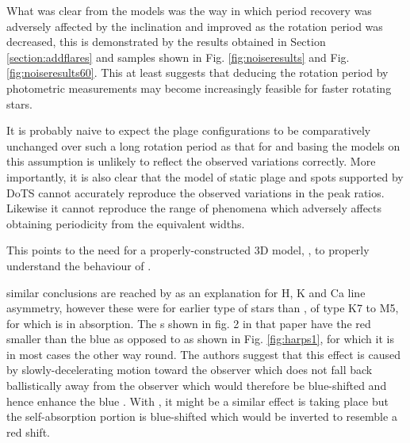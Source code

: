 What was clear from the models was the way in which period recovery was adversely affected by the inclination and
improved as the rotation period was decreased, this is demonstrated by the results obtained in Section
\ref{section:addflares} and samples shown in Fig. \ref{fig:noiseresults} and Fig. \ref{fig:noiseresults60}. This at
least suggests that deducing the rotation period by photometric measurements may become increasingly feasible for faster
rotating stars. 

It is probably naive to expect the plage configurations to be comparatively unchanged over such a long rotation period
as that for {\prox} and basing the models on this assumption is unlikely to reflect the observed variations
correctly. More importantly, it is also clear that the model of static plage and spots supported by DoTS cannot
accurately reproduce the observed variations in the peak ratios. Likewise it cannot reproduce the range of phenomena which
adversely affects obtaining periodicity from the equivalent widths.

 This points to the need for a properly-constructed 3D model, , to properly understand the behaviour of \prox.

 similar conclusions are reached by \citet{rauscher06} as an explanation for H, K and Ca
  line asymmetry, however these were for earlier type of stars than \prox, of type K7 to M5, for which {\ha} is in
  absorption. The \horn s shown in fig. 2 in that paper have the red {\horn} smaller than the blue {\horn} as opposed to
  {\prox} as shown in Fig. \ref{fig:harps1}, for which it is in most cases the other way round. The authors suggest that
  this effect is caused by slowly-decelerating motion toward the observer which does not fall back ballistically away
  from the observer which would therefore be blue-shifted and hence enhance the blue \horn. With \prox, it might be a
  similar effect is taking place but the self-absorption portion is blue-shifted which would be inverted to resemble a
  red shift.

